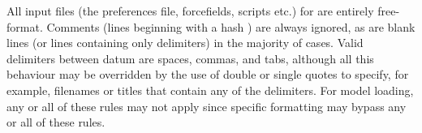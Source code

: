 All input files (the preferences file, forcefields, scripts etc.) for \progname{} are entirely free-format. Comments (lines beginning with a hash \qte{\#}) are always ignored, as are blank lines (or lines containing only delimiters) in the majority of cases. Valid delimiters between datum are spaces, commas, and tabs, although all this behaviour may be overridden by the use of double or single quotes to specify, for example, filenames or titles that contain any of the delimiters. For model loading, any or all of these rules may not apply since specific formatting may bypass any or all of these rules.\\




